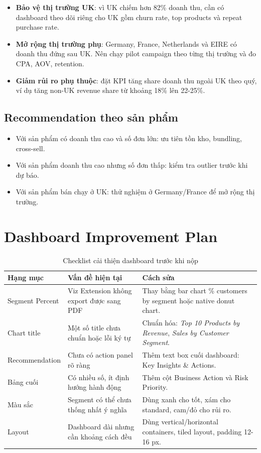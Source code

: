 \documentclass[11pt,a4paper]{article}
\begin{document}
\begin{itemize}
    \item \textbf{Bảo vệ thị trường UK}: vì UK chiếm hơn 82\% doanh thu, cần có dashboard theo dõi riêng cho UK gồm churn rate, top products và repeat purchase rate.
    \item \textbf{Mở rộng thị trường phụ}: Germany, France, Netherlands và EIRE có doanh thu đứng sau UK. Nên chạy pilot campaign theo từng thị trường và đo CPA, AOV, retention.
    \item \textbf{Giảm rủi ro phụ thuộc}: đặt KPI tăng share doanh thu ngoài UK theo quý, ví dụ tăng non-UK revenue share từ khoảng 18\% lên 22-25\%.
\end{itemize}

\subsection{Recommendation theo sản phẩm}

\begin{itemize}
    \item Với sản phẩm có doanh thu cao và số đơn lớn: ưu tiên tồn kho, bundling, cross-sell.
    \item Với sản phẩm doanh thu cao nhưng số đơn thấp: kiểm tra outlier trước khi dự báo.
    \item Với sản phẩm bán chạy ở UK: thử nghiệm ở Germany/France để mở rộng thị trường.
\end{itemize}

\section{Dashboard Improvement Plan}

\begin{table}[H]
\centering
\caption{Checklist cải thiện dashboard trước khi nộp}
\begin{tabularx}{\textwidth}{p{4.2cm}p{5.8cm}X}
\toprule
\textbf{Hạng mục} & \textbf{Vấn đề hiện tại} & \textbf{Cách sửa} \\
\midrule
Segment Percent & Viz Extension không export được sang PDF & Thay bằng bar chart \% customers by segment hoặc native donut chart. \\
Chart title & Một số title chưa chuẩn hoặc lỗi ký tự & Chuẩn hóa: \textit{Top 10 Products by Revenue}, \textit{Sales by Customer Segment}. \\
Recommendation & Chưa có action panel rõ ràng & Thêm text box cuối dashboard: Key Insights \& Actions. \\
Bảng cuối & Có nhiều số, ít định hướng hành động & Thêm cột Business Action và Risk Priority. \\
Màu sắc & Segment có thể chưa thống nhất ý nghĩa & Dùng xanh cho tốt, xám cho standard, cam/đỏ cho rủi ro. \\
Layout & Dashboard dài nhưng cần khoảng cách đều & Dùng vertical/horizontal containers, tiled layout, padding 12-16 px. \\
\bottomrule
\end{tabularx}
\end{table}
\end{document}
